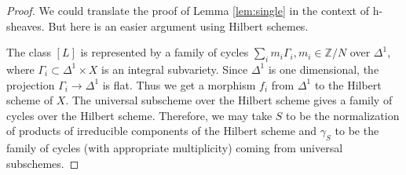 \documentclass{amsart}
\theoremstyle{definition}
\theoremstyle{remark}
\newcommand{\mbb}{\mathbb}
\newcommand{\ZZ}{\mbb{Z}}
\begin{document}
\begin{proof}
We could translate the proof of Lemma \ref{lem:single} in the context of h-sheaves.
But here is an easier argument using Hilbert schemes.

The class $[L]$ is represented by a family of cycles $\sum_i m_i \Gamma_i, m_i \in \ZZ/N$ over $\Delta^1$, where $\Gamma_i \subset \Delta^1 \times X$ is an integral subvariety. Since $\Delta^1$ is one dimensional, the projection $\Gamma_i \to \Delta^1$ is flat. 
Thus we get a morphism $f_i$ from  $\Delta^1$ to the Hilbert scheme of $X$.
The universal subscheme over the Hilbert scheme gives a family of cycles over the Hilbert scheme.
Therefore, we may take $S$ to be the normalization of products of irreducible components of the Hilbert scheme and $\gamma_S$ to be the family of cycles (with appropriate multiplicity) coming from universal subschemes.
\end{proof}
\end{document}
